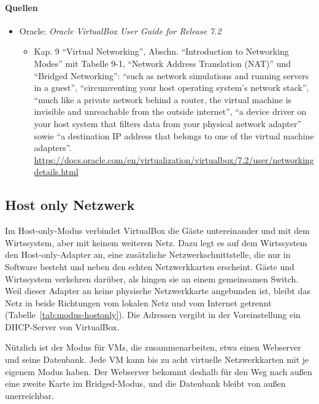 \paragraph{Quellen}
\begin{itemize}[quellen]
  \item Oracle: \emph{Oracle VirtualBox User Guide for Release 7.2}
  \begin{itemize}[nosep]
    \item Kap. 9 \enquote{Virtual Networking}, Abschn. \enquote{Introduction to Networking Modes} mit Tabelle 9-1, \enquote{Network Address Translation (NAT)} und \enquote{Bridged Networking}: \enquote{such as network simulations and running servers in a guest}, \enquote{circumventing your host operating system's network stack}, \enquote{much like a private network behind a router, the virtual machine is invisible and unreachable from the outside internet}, \enquote{a device driver on your host system that filters data from your physical network adapter} sowie \enquote{a destination IP address that belongs to one of the virtual machine adapters}. \url{https://docs.oracle.com/en/virtualization/virtualbox/7.2/user/networkingdetails.html}
  \end{itemize}
\end{itemize}

\subsection{Host only Netzwerk}
\label{sec:modus-hostonly}

Im Host-only-Modus verbindet VirtualBox die Gäste untereinander und mit dem Wirtssystem, aber mit keinem weiteren Netz. Dazu legt es auf dem Wirtssystem den Host-only-Adapter an, eine zusätzliche Netzwerkschnittstelle, die nur in Software besteht und neben den echten Netzwerkkarten erscheint. Gäste und Wirtssystem verkehren darüber, als hingen sie an einem gemeinsamen Switch. Weil dieser Adapter an keine physische Netzwerkkarte angebunden ist, bleibt das Netz in beide Richtungen vom lokalen Netz und vom Internet getrennt (Tabelle~\ref{tab:modus-hostonly}). Die Adressen vergibt in der Voreinstellung ein DHCP-Server von VirtualBox.

Nützlich ist der Modus für VMs, die zusammenarbeiten, etwa einen Webserver und seine Datenbank. Jede VM kann bis zu acht virtuelle Netzwerkkarten mit je eigenem Modus haben. Der Webserver bekommt deshalb für den Weg nach außen eine zweite Karte im Bridged-Modus, und die Datenbank bleibt von außen unerreichbar.

